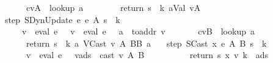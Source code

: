 \begin{isabellebody}
\ \ \ \ \ \ \ {\isacharparenleft}cv{\isacharcomma}A{\isacharparenright}\ {\isacharcolon}{\isacharequal}\ lookup\ a\ {\isasymmu}{\isacharsemicolon}\isanewline
\ \ \ \ \ \ \ return\ {\isacharparenleft}s{\isacharcomma}\ {\isasymrho}{\isacharcomma}\ k{\isacharcomma}\ {\isacharparenleft}a{\isacharcomma}{\isacharparenleft}Val\ v{}{\isacharcomma}A{\isacharparenright}{\isacharparenright}{\isacharhash}{\isasymmu}{\isacharcomma}\ {\isacharbrackleft}{\isacharbrackright}{\isacharparenright}{\isacharparenright}{\isachardoublequoteclose}\ {\isacharbar}\isanewline
\ \ {\isachardoublequoteopen}step\ {\isacharparenleft}SDynUpdate\ e{}\ e{}\ A\ s{\isacharcomma}\ {\isasymrho}{\isacharcomma}\ k{\isacharcomma}\ {\isasymmu}{\isacharcomma}\ {\isacharbrackleft}{\isacharbrackright}{\isacharparenright}\ {\isacharequal}\isanewline
\ \ \ \ \ \ {\isacharparenleft}v{}\ {\isacharcolon}{\isacharequal}\ eval\ e{}\ {\isasymrho}\ {\isasymmu}{\isacharsemicolon}\ v{}\ {\isacharcolon}{\isacharequal}\ eval\ e{}\ {\isasymrho}\ {\isasymmu}{\isacharsemicolon}\ a\ {\isacharcolon}{\isacharequal}\ to{\isacharunderscore}addr\ v{}{\isacharsemicolon}\isanewline
\ \ \ \ \ \ \ {\isacharparenleft}cv{\isacharcomma}B{\isacharparenright}\ {\isacharcolon}{\isacharequal}\ lookup\ a\ {\isasymmu}{\isacharsemicolon}\isanewline
\ \ \ \ \ \ \ return\ {\isacharparenleft}s{\isacharcomma}\ {\isasymrho}{\isacharcomma}\ k{\isacharcomma}\ {\isacharparenleft}a{\isacharcomma}\ {\isacharparenleft}VCast\ v{}\ A\ B{\isacharcomma}B{\isacharparenright}{\isacharparenright}{\isacharhash}{\isasymmu}{\isacharcomma}\ {\isacharbrackleft}a{\isacharbrackright}{\isacharparenright}{\isacharparenright}{\isachardoublequoteclose}\ {\isacharbar}\isanewline
\ \ {\isachardoublequoteopen}step\ {\isacharparenleft}SCast\ x\ e\ A\ B\ s{\isacharcomma}\ {\isasymrho}{\isacharcomma}\ k{\isacharcomma}\ {\isasymmu}{\isacharcomma}\ {\isacharbrackleft}{\isacharbrackright}{\isacharparenright}\ {\isacharequal}\isanewline
\ \ \ \ \ \ \ {\isacharparenleft}v\ {\isacharcolon}{\isacharequal}\ eval\ e\ {\isasymrho}\ {\isasymmu}{\isacharsemicolon}\ {\isacharparenleft}v{\isacharprime}{\isacharcomma}{\isasymmu}{\isacharprime}{\isacharcomma}ads{\isacharparenright}\ {\isacharcolon}{\isacharequal}\ cast\ v\ A\ B\ {\isasymmu}\ {\isacharbrackleft}{\isacharbrackright}{\isacharsemicolon}\isanewline
\ \ \ \ \ \ \ \ return\ {\isacharparenleft}s{\isacharcomma}\ {\isacharparenleft}x{\isacharcomma}\ v{\isacharprime}{\isacharparenright}{\isacharhash}{\isasymrho}{\isacharcomma}\ k{\isacharcomma}\ {\isasymmu}{\isacharprime}{\isacharcomma}\ ads{\isacharparenright}{\isacharparenright}{\isachardoublequoteclose}\ {\isacharbar}\isanewline

\end{isabellebody}
